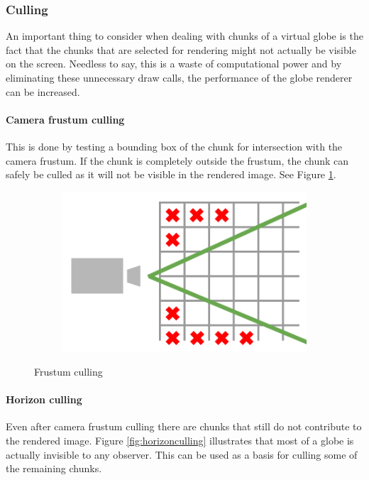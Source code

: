 \subsubsection{Culling}
An important thing to consider when dealing with chunks of a virtual globe is the fact that the chunks that are selected for rendering might not actually be visible on the screen. Needless to say, this is a waste of computational power and by eliminating these unnecessary draw calls, the performance of the globe renderer can be increased.

\paragraph{Camera frustum culling} This is done by testing a bounding box of the chunk for intersection with the camera frustum. If the chunk is completely outside the frustum, the chunk can safely be culled as it will not be visible in the rendered image. See Figure \ref{fig:frustumculling}.

\begin{figure}[htbp]
    \centering
    \begin{subfigure}[bt]{0.4\textwidth}
        \includegraphics[width=\textwidth]{figures/chunkedlod/frustumculling.pdf}
    \end{subfigure}
    \caption{Frustum culling}
    \label{fig:frustumculling}
\end{figure}

\paragraph{Horizon culling} Even after camera frustum culling there are chunks that still do not contribute to the rendered image. Figure \ref{fig:horizonculling} illustrates that most of a globe is actually invisible to any observer. This can be used as a basis for culling some of the remaining chunks. 


